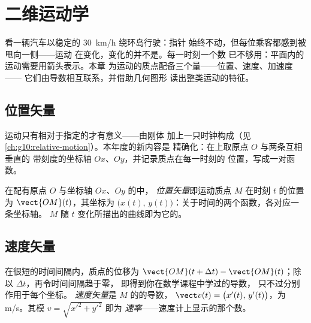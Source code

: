 \chapter{二维运动学}\label{ch:g12:kinematics-2d}

看一辆汽车以稳定的 \qty{30}{km/h} 绕环岛行驶：指针
始终不动，但每位乘客都感到被甩向一侧——运动
在变化，变化的并不是。每一时刻一个数
已不够用：平面内的运动需要用箭头表示。本章
为运动的质点配备三个量——位置、速度、加速度——
它们由导数相互联系，并借助几何图形
读出整类运动的特征。

\section{位置矢量}

运动只有相对于指定的才有意义——由刚体
加上一只时钟构成（见\cref{ch:g10:relative-motion}）。本年度的新内容是
精确化：在上取原点 $O$ 与两条互相垂直的
带刻度的坐标轴 $Ox$、$Oy$，并记录质点在每一时刻的
位置，写成一对函数。

\begin{definition}[位置矢量]\label{def:g12:kinematics-2d:position}
在配有原点 $O$ 与坐标轴 $Ox$、$Oy$ 的中，
\emph{位置矢量}即运动质点 $M$
在时刻 $t$ 的位置为 $\vect{OM}(t)$，其坐标为
$\bigl(x(t),\, y(t)\bigr)$：关于时间的两个函数，各对应一条坐标轴。
$M$ 随 $t$ 变化所描出的曲线即为它的。
\end{definition}

\section{速度矢量}

\begin{definition}[速度矢量]\label{def:g12:kinematics-2d:velocity}
在很短的时间间隔内，质点的位移为
$\vect{OM}(t+\Delta t) - \vect{OM}(t)$；除以 $\Delta t$，再令时间间隔趋于零，
即得到你在数学课程中学过的导数，
只不过分别作用于每个坐标。
\emph{速度矢量}是 $M$ 的的导数，
$\vect v(t) = \bigl(x'(t),\, y'(t)\bigr)$，为
\unit{m/s}。其模 $v = \sqrt{x'^2 + y'^2}$ 即为
\emph{速率}——速度计上显示的那个数。
\end{definition}

